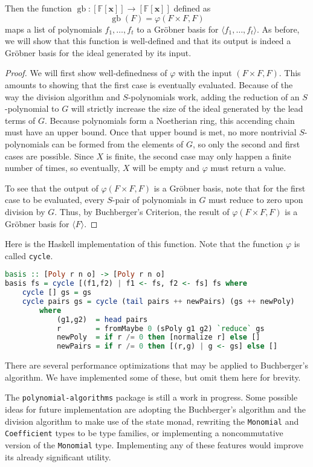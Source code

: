 \documentclass[MS, xcolor=dvipsnames]{wfuthesis}
\def\bF{\mathbb{F}}
\DeclareMathOperator{\gb}{gb}
\theoremstyle{definition}
\def\p{\varphi}
\begin{document}
Then the function $\gb: [\bF[\mathbf x]] \to [\bF[\mathbf x]]$ defined as
\[ \gb(F) = \p(F \times F,F) \]
maps a list of polynomials $f_1,\dots,f_t$ to a Gr\"obner basis for $\langle f_1,\dots,f_t \rangle$. As before, we will show that this function is well-defined and that its output is indeed a Gr\"obner basis for the ideal generated by its input.
\begin{proof}
  We will first show well-definedness of $\p$ with the input $(F \times F,F)$. This amounts to showing that the first case is eventually evaluated. Because of the way the division algorithm and $S$-polynomials work, adding the reduction of an $S$-polynomial to $G$ will strictly increase the size of the ideal generated by the lead terms of $G$. Because polynomials form a Noetherian ring, this accending chain must have an upper bound. Once that upper bound is met, no more nontrivial $S$-polynomials can be formed from the elements of $G$, so only the second and first cases are possible. Since $X$ is finite, the second case may only happen a finite number of times, so eventually, $X$ will be empty and $\p$ must return a value. \par
  To see that the output of $\p(F \times F,F)$ is a Gr\"obner basis, note that for the first case to be evaluated, every $S$-pair of polynomials in $G$ must reduce to zero upon division by $G$. Thus, by Buchberger's Criterion, the result of $\p(F \times F,F)$ is a Gr\"obner basis for $\langle F \rangle$.
\end{proof}
Here is the Haskell implementation of this function. Note that the function $\p$ is called \lstinline{cycle}.
\begin{lstlisting}[language=Haskell]
basis :: [Poly r n o] -> [Poly r n o]
basis fs = cycle [(f1,f2) | f1 <- fs, f2 <- fs] fs where
    cycle [] gs = gs
    cycle pairs gs = cycle (tail pairs ++ newPairs) (gs ++ newPoly)
        where
            (g1,g2)  = head pairs
            r        = fromMaybe 0 (sPoly g1 g2) `reduce` gs
            newPoly  = if r /= 0 then [normalize r] else []
            newPairs = if r /= 0 then [(r,g) | g <- gs] else []
\end{lstlisting}
There are several performance optimizations that may be applied to Buchberger's algorithm. We have implemented some of these, but omit them here for brevity. \par 
The \lstinline{polynomial-algorithms} package is still a work in progress. Some possible ideas for future implementation are adopting the Buchberger's algorithm and the division algorithm to make use of the state monad, rewriting the \lstinline{Monomial} and \lstinline{Coefficient} types to be type families, or implementing a noncommutative version of the \lstinline{Monomial} type. Implementing any of these features would improve its already significant utility.
\end{document}
